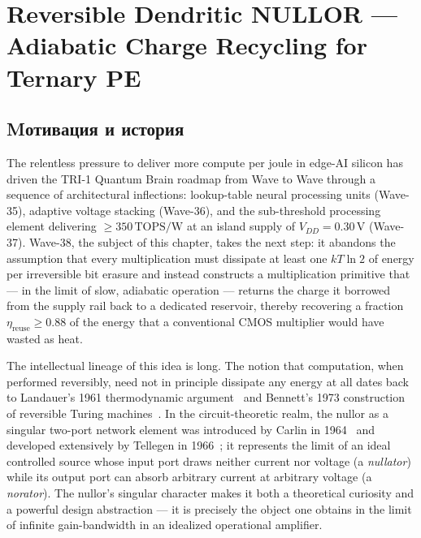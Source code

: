 
\chapter{Reversible Dendritic NULLOR --- Adiabatic Charge Recycling for Ternary PE}
\label{ch:nullor}

\section{Mотивация и история}
\label{sec:nullor_motivation}

The relentless pressure to deliver more compute per joule in edge-AI silicon has driven
the TRI-1 Quantum Brain roadmap from Wave to Wave through a sequence of architectural
inflections: lookup-table neural processing units (Wave-35), adaptive voltage stacking
(Wave-36), and the sub-threshold processing element delivering $\geq 350\,\text{TOPS/W}$
at an island supply of $V_{DD}=0.30\,\text{V}$ (Wave-37).  Wave-38, the subject of this
chapter, takes the next step: it abandons the assumption that every multiplication must
dissipate at least one $kT\ln 2$ of energy per irreversible bit erasure and instead
constructs a multiplication primitive that --- in the limit of slow, adiabatic operation
--- returns the charge it borrowed from the supply rail back to a dedicated reservoir,
thereby recovering a fraction $\eta_{\text{reuse}} \geq 0.88$ of the energy that a
conventional CMOS multiplier would have wasted as heat.

The intellectual lineage of this idea is long.  The notion that computation, when
performed reversibly, need not in principle dissipate any energy at all dates back to
Landauer's 1961 thermodynamic argument~\cite{landauer1961irreversibility} and Bennett's
1973 construction of reversible Turing machines~\cite{bennett1973logical}.  In the
circuit-theoretic realm, the nullor as a singular two-port network element was
introduced by Carlin in 1964~\cite{carlin1964singular} and developed extensively by
Tellegen in 1966~\cite{tellegen1966nullor}; it represents the limit of an ideal
controlled source whose input port draws neither current nor voltage (a \emph{nullator})
while its output port can absorb arbitrary current at arbitrary voltage (a
\emph{norator}).  The nullor's singular character makes it both a theoretical curiosity
and a powerful design abstraction --- it is precisely the object one obtains in the
limit of infinite gain-bandwidth in an idealized operational amplifier.

